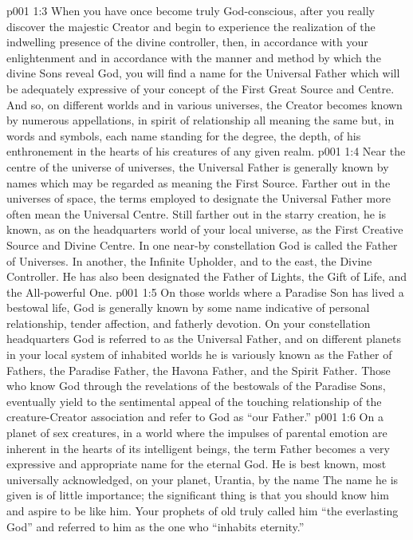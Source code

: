 \vs p001 1:3 When you have once become truly God\hyp{}conscious, after you really discover the majestic Creator and begin to experience the realization of the indwelling presence of the divine controller, then, in accordance with your enlightenment and in accordance with the manner and method by which the divine Sons reveal God, you will find a name for the Universal Father which will be adequately expressive of your concept of the First Great Source and Centre. And so, on different worlds and in various universes, the Creator becomes known by numerous appellations, in spirit of relationship all meaning the same but, in words and symbols, each name standing for the degree, the depth, of his enthronement in the hearts of his creatures of any given realm.
\vs p001 1:4 \pc Near the centre of the universe of universes, the Universal Father is generally known by names which may be regarded as meaning the First Source. Farther out in the universes of space, the terms employed to designate the Universal Father more often mean the Universal Centre. Still farther out in the starry creation, he is known, as on the headquarters world of your local universe, as the First Creative Source and Divine Centre. In one near\hyp{}by constellation God is called the Father of Universes. In another, the Infinite Upholder, and to the east, the Divine Controller. He has also been designated the Father of Lights, the Gift of Life, and the All\hyp{}powerful One.
\vs p001 1:5 On those worlds where a Paradise Son has lived a bestowal life, God is generally known by some name indicative of personal relationship, tender affection, and fatherly devotion. On your constellation headquarters God is referred to as the Universal Father, and on different planets in your local system of inhabited worlds he is variously known as the Father of Fathers, the Paradise Father, the Havona Father, and the Spirit Father. Those who know God through the revelations of the bestowals of the Paradise Sons, eventually yield to the sentimental appeal of the touching relationship of the creature\hyp{}Creator association and refer to God as “our Father.”
\vs p001 1:6 On a planet of sex creatures, in a world where the impulses of parental emotion are inherent in the hearts of its intelligent beings, the term Father becomes a very expressive and appropriate name for the eternal God. He is best known, most universally acknowledged, on your planet, Urantia, by the name  The name he is given is of little importance; the significant thing is that you should know him and aspire to be like him. Your prophets of old truly called him “the everlasting God” and referred to him as the one who “inhabits eternity.”
